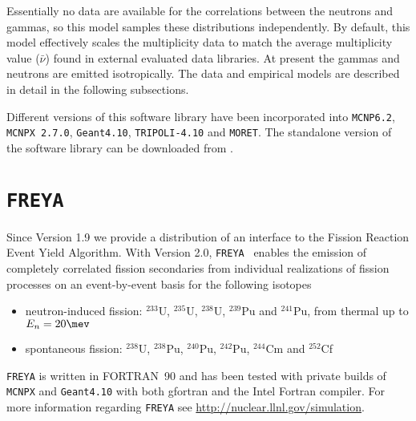 \documentclass[fleqn,11pt]{article}
\begin{document}
Essentially no data are available for the correlations between the
neutrons and gammas, so this model samples these distributions
independently. By default, this model effectively scales the
multiplicity data to match the average multiplicity value
($\bar{\nu}$) found in external evaluated data libraries. At present
the gammas and neutrons are emitted isotropically. The data and
empirical models are described in detail in the following subsections.

Different versions of this software library have been incorporated into 
{\tt MCNP6.2\textsuperscript{\textregistered}},
{\tt MCNPX 2.7.0},
{\tt Geant4.10},
{\tt TRIPOLI-4.10\textsuperscript{\textregistered}} and
{\tt MORET}. The standalone version of the software library can be downloaded from \httpnuclear.

\section{{\tt FREYA}}
Since Version 1.9 we provide a distribution of an interface to the Fission Reaction Event Yield Algorithm. With Version 2.0, {\tt FREYA}~\cite{Verbeke 2016} enables the emission of completely correlated fission secondaries from individual realizations of fission processes on an event-by-event basis for the following isotopes
\begin{itemize}
\item neutron-induced fission: $^{233}$U, $^{235}$U, $^\text{238}$U, $^{239}$Pu and $^\text{241}$Pu, from thermal up to $E_n = 20 \mev$
\item spontaneous fission:	$^{238}$U, $^\text{238}$Pu, $^{240}$Pu, $^\text{242}$Pu, $^{244}$Cm and $^{252}$Cf
\end{itemize}

{\tt FREYA} is written in FORTRAN~90 and has been tested with private builds of {\tt MCNPX} and {\tt Geant4.10} with both gfortran and the Intel Fortran compiler. For more information regarding {\tt FREYA} see \url{http://nuclear.llnl.gov/simulation}.

  \clearpage
 \clearpage
 \clearpage


\begin{thebibliography}{99}


\end{thebibliography}
\end{document}
